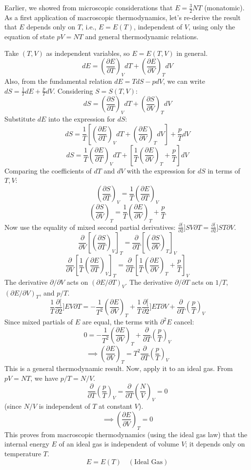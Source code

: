 \documentclass[11pt]{article}
\newcommand{\pderiv}[2]{\frac{\partial #1}{\partial #2}}
\begin{document}
Earlier, we showed from microscopic considerations that $E = \frac{3}{2} N T$ (monatomic). As a first application of macroscopic thermodynamics, let's re-derive the result that $E$ depends only on $T$, i.e., $E=E(T)$, independent of $V$, using only the equation of state $pV=NT$ and general thermodynamic relations.

Take $(T, V)$ as independent variables, so $E=E(T,V)$ in general.
\[ dE = \left( \pderiv{E}{T} \right)_V dT + \left( \pderiv{E}{V} \right)_T dV \]
Also, from the fundamental relation $dE = T dS - p dV$, we can write $dS = \frac{1}{T} dE + \frac{p}{T} dV$.
Considering $S=S(T,V)$:
\[ dS = \left( \pderiv{S}{T} \right)_V dT + \left( \pderiv{S}{V} \right)_T dV \]
Substitute $dE$ into the expression for $dS$:
\[ dS = \frac{1}{T} \left[ \left( \pderiv{E}{T} \right)_V dT + \left( \pderiv{E}{V} \right)_T dV \right] + \frac{p}{T} dV \]
\[ dS = \frac{1}{T} \left( \pderiv{E}{T} \right)_V dT + \left[ \frac{1}{T} \left( \pderiv{E}{V} \right)_T + \frac{p}{T} \right] dV \]
Comparing the coefficients of $dT$ and $dV$ with the expression for $dS$ in terms of $T, V$:
\[ \left( \pderiv{S}{T} \right)_V = \frac{1}{T} \left( \pderiv{E}{T} \right)_V \]
\[ \left( \pderiv{S}{V} \right)_T = \frac{1}{T} \left( \pderiv{E}{V} \right)_T + \frac{p}{T} \]
Now use the equality of mixed second partial derivatives: $\pderiv[2]{S}{V \partial T} = \pderiv[2]{S}{T \partial V}$.
\[ \pderiv{}{V} \left[ \left( \pderiv{S}{T} \right)_V \right]_T = \pderiv{}{T} \left[ \left( \pderiv{S}{V} \right)_T \right]_V \]
\[ \pderiv{}{V} \left[ \frac{1}{T} \left( \pderiv{E}{T} \right)_V \right]_T = \pderiv{}{T} \left[ \frac{1}{T} \left( \pderiv{E}{V} \right)_T + \frac{p}{T} \right]_V \]
The derivative $\partial/\partial V$ acts on $(\partial E/\partial T)_V$. The derivative $\partial/\partial T$ acts on $1/T$, $(\partial E/\partial V)_T$, and $p/T$.
\[ \frac{1}{T} \pderiv[2]{E}{V \partial T} = -\frac{1}{T^2} \left( \pderiv{E}{V} \right)_T + \frac{1}{T} \pderiv[2]{E}{T \partial V} + \pderiv{}{T} \left( \frac{p}{T} \right)_V \]
Since mixed partials of $E$ are equal, the terms with $\partial^2 E$ cancel:
\[ 0 = -\frac{1}{T^2} \left( \pderiv{E}{V} \right)_T + \pderiv{}{T} \left( \frac{p}{T} \right)_V \]
\[ \implies \left( \pderiv{E}{V} \right)_T = T^2 \pderiv{}{T} \left( \frac{p}{T} \right)_V \]
This is a general thermodynamic result.
Now, apply it to an ideal gas. From $pV=NT$, we have $p/T = N/V$.
\[ \pderiv{}{T} \left( \frac{p}{T} \right)_V = \pderiv{}{T} \left( \frac{N}{V} \right)_V = 0 \]
(since $N/V$ is independent of $T$ at constant $V$).
\[ \implies \left( \pderiv{E}{V} \right)_T = 0 \]
This proves from macroscopic thermodynamics (using the ideal gas law) that the internal energy $E$ of an ideal gas is independent of volume $V$; it depends only on temperature $T$.
\[ E = E(T) \quad (\text{Ideal Gas}) \]
\end{document}
